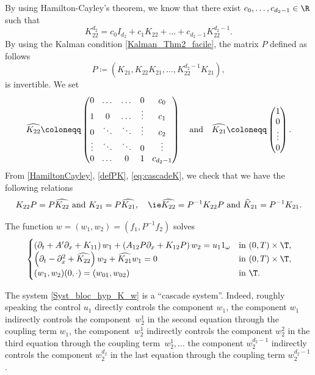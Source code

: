 By using Hamilton-Cayley's theorem, we know that there exist $c_0, \dots, c_{d_2-1} \in \R$ such that
\begin{equation}
\label{HamiltonCayley}
K_{22}^{d_2} = c_0 I_{d_2} + c_1 K_{22} + \dots + c_{d_2-1} K_{22}^{d_2-1}.
\end{equation}
By using the Kalman condition \eqref{Kalman_Thm2_facile}, the matrix $P$ defined as follows
\begin{equation}
\label{defPK}
P \coloneqq (K_{21}, K_{22} K_{21}, \dots, K_{22}^{d_2-1} K_{21}),
\end{equation}
is invertible. We set
\begin{equation}
\label{eq:cascadeK}
\arraycolsep4.5pt
\widehat{K_{22}}\coloneqq \begin{pmatrix} 0 & \dots & \dots & 0 & c_0\\
1 & 0 &\dots & \vdots & c_1\\
0 & \ddots & \ddots & \vdots & c_2\\
\vdots & \ddots & \ddots & 0 & \vdots\\
0 & \dots &0 & 1 & c_{d_2-1}
\end{pmatrix}\quad \text{and}\quad \widehat{K_{21}}\coloneqq \begin{pmatrix} 1\\0\\ \vdots\\ 0 \end{pmatrix}.
\end{equation}
From \eqref{HamiltonCayley}, \eqref{defPK}, \eqref{eq:cascadeK}, we check that we have the following relations
\[
K_{22}P = P \widehat{K_{22}}\ \text{and}\ K_{21} = P \widehat{K_{21}},\quad \text{\ie} \widehat{K_{22}}= P^{-1} K_{22} P\ \text{and}\ {\widehat K}_{21}= P^{-1} K_{21}.
\]

The function $w =(w_1,w_2) = (f_1,P^{-1}f_2)$ solves
\begin{equation} \label{Syst_bloc_hyp_K_w}
\begin{cases}
\left(\partial_t +A'\partial_x+K_{11}\right)w_1+\left(A_{12}P\partial_x+K_{12}P\right)w_2= u_1 1_\omega
&\text{in}\ (0,T)\times \T,\!\\
\left(\partial_t - \partial_x^2+\widehat{K_{22}}\right)w_2 + \widehat{K_{21}}w_1 = 0 &\text{in}\ (0,T)\times \T,\!\\
(w_1,w_2)(0,\cdot)=(w_{01},w_{02}) & \text{in}\ \T.
\end{cases}
\end{equation}

The system \eqref{Syst_bloc_hyp_K_w} is a ``cascade system''. Indeed, roughly speaking the control $u_1$ directly controls the component $w_1$, the component $w_1$ indirectly controls the component~$w_{2}^1$ in the second equation through the coupling term $w_1$, the component~$w_{2}^1$ indirectly controls the component $w_{2}^2$ in the third equation through the coupling term~$w_2^1,\ldots$ the component $w_{2}^{d_2-1}$ indirectly controls the component $w_{2}^{d_2}$ in the last equation through the coupling term $w_2^{d_2-1}$.

